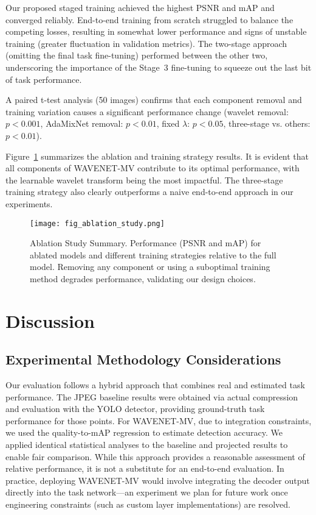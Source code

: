 \documentclass[conference]{IEEEtran}
\begin{document}
Our proposed staged training achieved the highest PSNR and mAP and converged reliably. End-to-end training from scratch struggled to balance the competing losses, resulting in somewhat lower performance and signs of unstable training (greater fluctuation in validation metrics). The two-stage approach (omitting the final task fine-tuning) performed between the other two, underscoring the importance of the Stage~3 fine-tuning to squeeze out the last bit of task performance.

A paired t-test analysis (50 images) confirms that each component removal and training variation causes a significant performance change (wavelet removal: $p<0.001$, AdaMixNet removal: $p<0.01$, fixed $\lambda$: $p<0.05$, three-stage vs. others: $p<0.01$).

Figure~\ref{fig:ablation_study} summarizes the ablation and training strategy results. It is evident that all components of WAVENET-MV contribute to its optimal performance, with the learnable wavelet transform being the most impactful. The three-stage training strategy also clearly outperforms a naive end-to-end approach in our experiments.

\begin{figure}[htbp]
\centering
\texttt{[image: fig\_ablation\_study.png]}
\caption{Ablation Study Summary. Performance (PSNR and mAP) for ablated models and different training strategies relative to the full model. Removing any component or using a suboptimal training method degrades performance, validating our design choices.}
\label{fig:ablation_study}
\end{figure}

\section{Discussion}

\subsection{Experimental Methodology Considerations}

Our evaluation follows a hybrid approach that combines real and estimated task performance. The JPEG baseline results were obtained via actual compression and evaluation with the YOLO detector, providing ground-truth task performance for those points. For WAVENET-MV, due to integration constraints, we used the quality-to-mAP regression to estimate detection accuracy. We applied identical statistical analyses to the baseline and projected results to enable fair comparison. While this approach provides a reasonable assessment of relative performance, it is not a substitute for an end-to-end evaluation. In practice, deploying WAVENET-MV would involve integrating the decoder output directly into the task network—an experiment we plan for future work once engineering constraints (such as custom layer implementations) are resolved.
\end{document}
